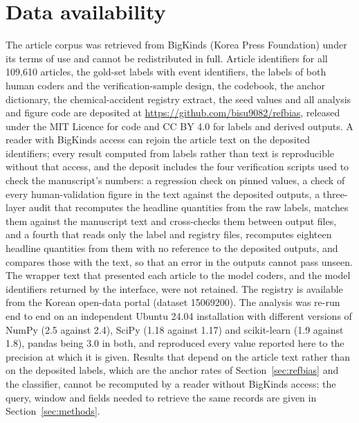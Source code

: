 \documentclass[1p,times]{elsarticle}
\begin{document}
\section*{Data availability}
The article corpus was retrieved from BigKinds (Korea Press Foundation) under its terms of use and cannot be redistributed in full. Article identifiers for all 109,610 articles, the gold-set labels with event identifiers, the labels of both human coders and the verification-sample design, the codebook, the anchor dictionary, the chemical-accident registry extract, the seed values and all analysis and figure code are deposited at \url{https://github.com/bisu9082/refbias}, released under the MIT Licence for code and CC BY 4.0 for labels and derived outputs. A reader with BigKinds access can rejoin the article text on the deposited identifiers; every result computed from labels rather than text is reproducible without that access, and the deposit includes the four verification scripts used to check the manuscript's numbers: a regression check on pinned values, a check of every human-validation figure in the text against the deposited outputs, a three-layer audit that recomputes the headline quantities from the raw labels, matches them against the manuscript text and cross-checks them between output files, and a fourth that reads only the label and registry files, recomputes eighteen headline quantities from them with no reference to the deposited outputs, and compares those with the text, so that an error in the outputs cannot pass unseen. The wrapper text that presented each article to the model coders, and the model identifiers returned by the interface, were not retained. The registry is available from the Korean open-data portal (dataset 15069200). The analysis was re-run end to end on an independent Ubuntu 24.04 installation with different versions of NumPy (2.5 against 2.4), SciPy (1.18 against 1.17) and scikit-learn (1.9 against 1.8), pandas being 3.0 in both, and reproduced every value reported here to the precision at which it is given. Results that depend on the article text rather than on the deposited labels, which are the anchor rates of Section~\ref{sec:refbias} and the classifier, cannot be recomputed by a reader without BigKinds access; the query, window and fields needed to retrieve the same records are given in Section~\ref{sec:methods}.



\end{document}
